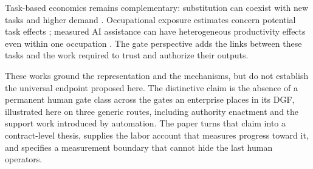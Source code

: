Task-based economics remains complementary: substitution can coexist with new tasks and higher
demand \citep{autor2015,acemoglu2019}. Occupational exposure estimates concern
potential task effects \citep{eloundou2024}; measured AI assistance can have heterogeneous
productivity effects even within one occupation \citep{brynjolfsson2025}. The gate perspective
adds the links between these tasks and the work required to trust and authorize their outputs.

These works ground the representation and the mechanisms, but do not establish the universal endpoint
proposed here. The distinctive claim is the absence of a permanent human gate class across the gates an enterprise places in its DGF, illustrated here on three generic routes, including authority enactment and the support work introduced by automation. The paper
turns that claim into a contract-level thesis, supplies the labor account that measures progress toward
it, and specifies a measurement boundary that cannot hide the last human operators.

